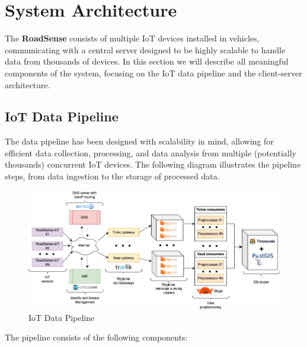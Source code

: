 \section{System Architecture}

The \textbf{RoadSense} consists of multiple IoT devices installed in vehicles, communicating with a central server designed to be highly scalable to handle data from thousands of devices. In this section we will describe all meaningful components of the system, focusing on the IoT data pipeline and the client-server architecture.

\subsection{IoT Data Pipeline}
\label{subsec:iot_data_pipeline}

The data pipeline has been designed with scalability in mind, allowing for efficient data collection, processing, and data analysis from multiple (potentially thousands) concurrent IoT devices. The following diagram illustrates the pipeline steps, from data ingestion to the storage of processed data.

\begin{figure}[H]
	\centering
	\includegraphics[width=\textwidth]{../../assets/diagrams/iot_data_pipeline/iot_data_pipeline.png}
	\caption{IoT Data Pipeline}
\end{figure}

The pipeline consists of the following components:


